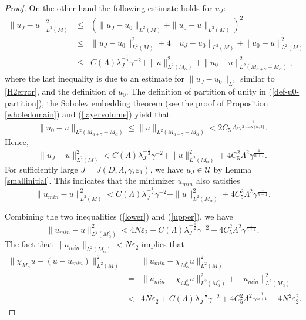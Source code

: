 \documentclass[11pt,letterpaper]{amsart}
\numberwithin{equation}{section}
\theoremstyle{definition}
\theoremstyle{plain}
\theoremstyle{definition}
\theoremstyle{plain}
\theoremstyle{definition}
\theoremstyle{plain}
\begin{document}
\begin{proof}
On the other hand the following estimate holds for $u_{J}$:
\begin{eqnarray*}
\|u_{J}-u\|_{L^2(M)}^2 &\leqslant& (\|u_{J}-u_0\|_{L^2(M)} + \|u_0-u\|_{L^2(M)})^2 \\
&\leqslant& \|u_{J}-u_0\|^2_{L^2(M)}+4\|u_{J}-u_0\|_{L^2(M)}  + \|u_0-u\|^2_{L^2(M)} \\
&\leqslant & C(\Lambda) \lambda_{J}^{-\frac{1}{2}}\gamma^{-2}+ \|u\|^2_{L^2(M_{\alpha})}+ \|u_0-u\|^2_{L^2(M_{\alpha+\gamma}-M_{\alpha})} ,
\end{eqnarray*}
where the last inequality is due to an estimate for $\|u_{J}-u_0\|_{L^2}$ similar to \eqref{H2error}, and the definition of $u_0$. The definition of partition of unity in (\ref{def-u0-partition}), the Sobolev embedding theorem (see the proof of Proposition \ref{wholedomain}) and (\ref{layervolume}) yield that
$$\|u_0-u\|_{L^2(M_{\alpha+\gamma}-M_{\alpha})}\leqslant \|u\|_{L^2(M_{\alpha+\gamma}-M_{\alpha})} < 2C_5\Lambda \gamma^{\frac{1}{2\max\{n,3\}}}.$$
Hence,
$$\|u_{J}-u\|_{L^2(M)}^2 < C(\Lambda) \lambda_{J}^{-\frac{1}{2}}\gamma^{-2}+ \|u\|^2_{L^2(M_{\alpha})}+ 4C_5^2\Lambda^2 \gamma^{\frac{1}{n+1}}.$$
For sufficiently large $J=J(D,\Lambda,\gamma,\varepsilon_1)$, we have $u_{J}\in \mathcal{U}$ by Lemma \ref{smallinitial}. This indicates that the minimizer $u_{min}$ also satisfies
\begin{equation} \label{upper}
\|u_{min}-u\|_{L^2(M)}^2 < C(\Lambda) \lambda_{J}^{-\frac{1}{2}}\gamma^{-2}+ \|u\|^2_{L^2(M_{\alpha})}+ 4C_5^2\Lambda^2 \gamma^{\frac{1}{n+1}}.
\end{equation}

Combining the two inequalities (\ref{lower}) and (\ref{upper}), we have
$$\|u_{min}-u\|^2_{L^2(M_{\alpha}^c)} < 4N\varepsilon_2 +C(\Lambda) \lambda_{J}^{-\frac{1}{2}}\gamma^{-2}+ 4C_5^2\Lambda^2\gamma^{\frac{1}{n+1}}.$$
The fact that $\|u_{min}\|_{L^2(M_{\alpha})}< N\varepsilon_2$ implies that
\begin{eqnarray*}
\|\chi_{M_{\alpha}}u-(u-u_{min})\|^2_{L^2(M)}&=&\|u_{min}-\chi_{M_{\alpha}^c}u\|^2_{L^2(M)} \\
&=& \|u_{min}-\chi_{M_{\alpha}^c}u\|^2_{L^2(M_{\alpha}^c)}+\|u_{min}\|^2_{L^2(M_{\alpha})} \\
&<& 4N\varepsilon_2 +C(\Lambda) \lambda_{J}^{-\frac{1}{2}}\gamma^{-2}+4C_5^2\Lambda^2\gamma^{\frac{1}{n+1}} +4N^2\varepsilon_2^2 .
\end{eqnarray*}


\end{proof}
\end{document}
